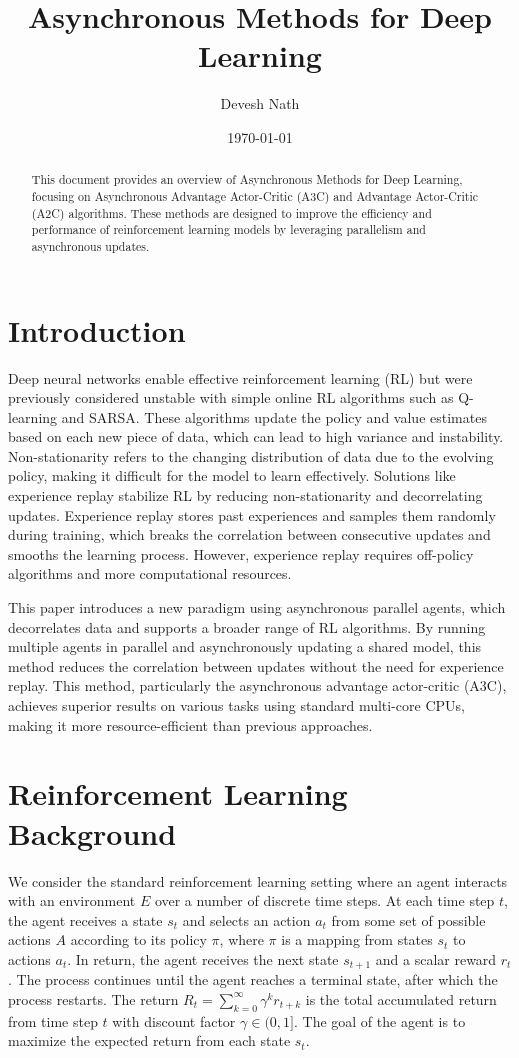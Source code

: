 \documentclass{article}
\title{Asynchronous Methods for Deep Learning }
\author{Devesh Nath}
\date{\today}
\begin{document}
\maketitle

\begin{abstract}
This document provides an overview of Asynchronous Methods for Deep Learning, focusing on Asynchronous Advantage Actor-Critic (A3C) and Advantage Actor-Critic (A2C) algorithms. These methods are designed to improve the efficiency and performance of reinforcement learning models by leveraging parallelism and asynchronous updates.
\end{abstract}

\section{Introduction}
Deep neural networks enable effective reinforcement learning (RL) but were previously considered unstable with simple online RL algorithms such as Q-learning and SARSA. These algorithms update the policy and value estimates based on each new piece of data, which can lead to high variance and instability. Non-stationarity refers to the changing distribution of data due to the evolving policy, making it difficult for the model to learn effectively. Solutions like experience replay stabilize RL by reducing non-stationarity and decorrelating updates. Experience replay stores past experiences and samples them randomly during training, which breaks the correlation between consecutive updates and smooths the learning process. However, experience replay requires off-policy algorithms and more computational resources.

This paper introduces a new paradigm using asynchronous parallel agents, which decorrelates data and supports a broader range of RL algorithms. By running multiple agents in parallel and asynchronously updating a shared model, this method reduces the correlation between updates without the need for experience replay. This method, particularly the asynchronous advantage actor-critic (A3C), achieves superior results on various tasks using standard multi-core CPUs, making it more resource-efficient than previous approaches.

\section{Reinforcement Learning Background}
We consider the standard reinforcement learning setting where an agent interacts with an environment \(E\) over a number of discrete time steps. At each time step \(t\), the agent receives a state \(s_t\) and selects an action \(a_t\) from some set of possible actions \(A\) according to its policy \(\pi\), where \(\pi\) is a mapping from states \(s_t\) to actions \(a_t\). In return, the agent receives the next state \(s_{t+1}\) and a scalar reward \(r_t\). The process continues until the agent reaches a terminal state, after which the process restarts. The return \(R_t = \sum_{k=0}^{\infty} \gamma^k r_{t+k}\) is the total accumulated return from time step \(t\) with discount factor \(\gamma \in (0, 1]\). The goal of the agent is to maximize the expected return from each state \(s_t\).
\end{document}
